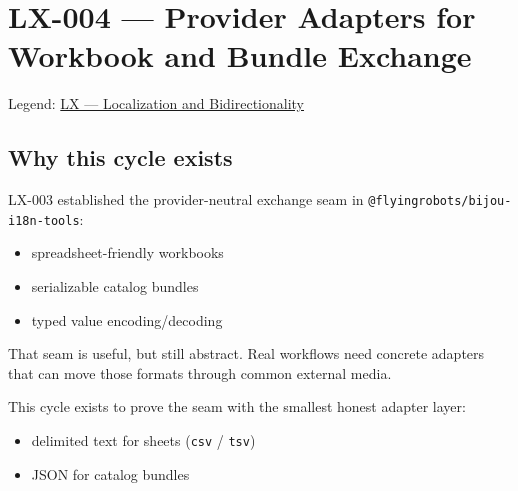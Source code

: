 \chapter{LX-004 --- Provider Adapters for Workbook and Bundle Exchange}\label{record-191}

\smallskip

Legend: \href{https://github.com/flyingrobots/bijou/blob/1853ad902f6bf219326409e7f743a5a1d6517dbc/docs/legends/LX-localization-and-bidirectionality.md}{LX --- Localization and Bidirectionality}

\section{Why this cycle exists}\label{record-191-why-this-cycle-exists}

LX-003 established the provider-neutral exchange seam in \texttt{@\allowbreak{}f\allowbreak{}l\allowbreak{}y\allowbreak{}i\allowbreak{}n\allowbreak{}g\allowbreak{}r\allowbreak{}o\allowbreak{}b\allowbreak{}o\allowbreak{}t\allowbreak{}s\allowbreak{}/\allowbreak{}b\allowbreak{}i\allowbreak{}j\allowbreak{}o\allowbreak{}u\allowbreak{}-\allowbreak{}i\allowbreak{}1\allowbreak{}8\allowbreak{}n\allowbreak{}-\allowbreak{}t\allowbreak{}o\allowbreak{}o\allowbreak{}l\allowbreak{}s}:

\begin{itemize}
\tightlist
\item
  spreadsheet-friendly workbooks
\item
  serializable catalog bundles
\item
  typed value encoding/decoding
\end{itemize}

That seam is useful, but still abstract. Real workflows need concrete adapters that can move those formats through common external media.

This cycle exists to prove the seam with the smallest honest adapter layer:

\begin{itemize}
\tightlist
\item
  delimited text for sheets (\texttt{c\allowbreak{}s\allowbreak{}v} / \texttt{t\allowbreak{}s\allowbreak{}v})
\item
  JSON for catalog bundles
\end{itemize}

